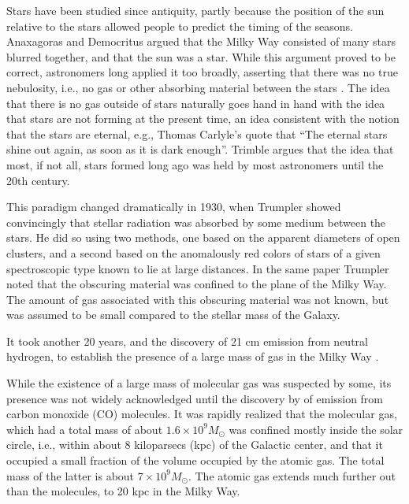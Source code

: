 \documentclass[../dissertation.tex]{subfiles}
\begin{document}
Stars have been studied since antiquity, partly because the position of the sun relative to the stars allowed people to predict the timing of the seasons. 
Anaxagoras and Democritus argued that the Milky Way consisted of many stars blurred together, and that the sun was a star. 
While this argument proved to be correct, astronomers long applied it too broadly, asserting that 
there was no true nebulosity, i.e., no gas or other absorbing material between the stars \citep{1997AIPC..393...15T}. 
The idea that there is no gas outside of stars naturally goes hand in hand with the idea that stars are not forming at the present time, 
an idea consistent with the notion that the stars are eternal, e.g., Thomas Carlyle's quote that ``The eternal stars shine out again, as soon as it is dark enough''. 
Trimble argues that the idea that most, if not all, stars formed long ago was held by most astronomers until the 20th century. 

This paradigm changed dramatically in 1930, when Trumpler \citep{1930LicOB..14..154T} showed convincingly that stellar radiation was absorbed by some medium between the stars. 
He did so using two methods, one based on the apparent diameters of open clusters, 
and a second based on the anomalously red colors of stars of a given spectroscopic type known to lie at large distances. 
In the same paper Trumpler noted that the obscuring material was confined to the plane of the Milky Way. 
The amount of gas associated with this obscuring material was not known, but was assumed to be small compared to the stellar mass of the Galaxy.

It took another 20 years, and the discovery of 21 cm emission from neutral hydrogen, to establish the presence of a 
large mass of gas in the Milky Way  \citep{1951Natur.168..356E,1951Natur.168..357M,1951Natur.168..358P}.

While the existence of a large mass of molecular gas was suspected by some, 
its presence was not widely acknowledged until the discovery by \citet{1970ApJ...161L..43W}
of emission from carbon monoxide (CO) molecules. 
It was rapidly realized that the molecular gas, which had a total mass of about $1.6\times10^9M_\odot$ \citep{1993AIPC..278..267D,2017ApJ...834...57M} 
was confined mostly inside the solar circle, i.e., within about 8 kiloparsecs (kpc) of the Galactic center, 
and that it occupied a small fraction of the volume occupied by the atomic gas. 
The total mass of the latter is about $7\times10^9M_\odot$. 
The atomic gas extends much further out than the molecules, to 20 kpc in the Milky Way. 
\end{document}
